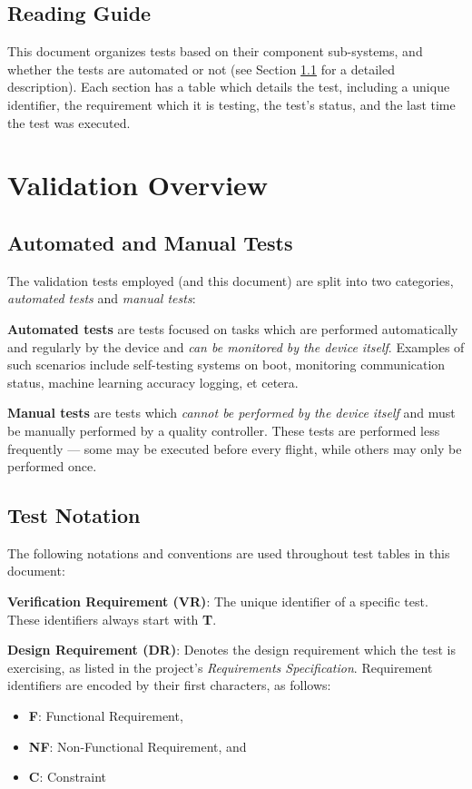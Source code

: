 \documentclass[10pt,letterpaper]{article}
\begin{document}
\subsection{Reading Guide}
This document organizes tests based on their component sub-systems, and whether the tests are automated or not (see Section \ref{auto} for a detailed description). Each section has a table which details the test, including a unique identifier, the requirement which it is testing, the test's status, and the last time the test was executed.

\section{Validation Overview}

\subsection{Automated and Manual Tests}\label{auto}
The validation tests employed (and this document) are split into two categories, \textit{automated tests} and \textit{manual tests}:

\textbf{Automated tests} are tests focused on tasks which are performed automatically and regularly by the device and \textit{can be monitored by the device itself}. Examples of such scenarios include self-testing systems on boot, monitoring communication status, machine learning accuracy logging, et cetera.

\textbf{Manual tests} are tests which \textit{cannot be performed by the device itself} and must be manually performed by a quality controller. These tests are performed less frequently --- some may be executed before every flight, while others may only be performed once. 

\subsection{Test Notation}
The following notations and conventions are used throughout test tables in this document:

\textbf{Verification Requirement (VR)}: The unique identifier of a specific test. These identifiers always start with \textbf{T}.

\textbf{Design Requirement (DR)}: Denotes the design requirement which the test is exercising, as listed in the project's \textit{Requirements Specification}. Requirement identifiers are encoded by their first characters, as follows:
\begin{itemize}
	\item \textbf{F}: Functional Requirement,
	\item \textbf{NF}: Non-Functional Requirement, and
	\item \textbf{C}: Constraint
\end{itemize}
\end{document}
